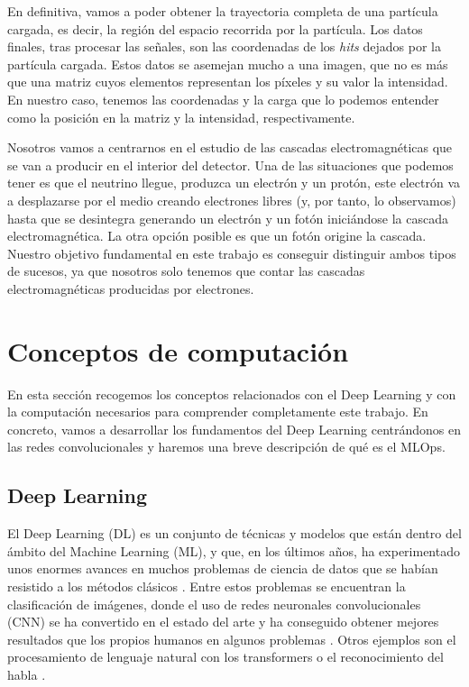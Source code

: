 \documentclass[a4paper,12pt,oneside,titlepage]{book}
\begin{document}
En definitiva, vamos a poder obtener la trayectoria completa de una partícula cargada, es decir, la región del espacio recorrida por la partícula. Los datos finales, tras procesar las señales, son las coordenadas de los \textit{hits} dejados por la partícula cargada. Estos datos se asemejan mucho a una imagen, que no es más que una matriz cuyos elementos representan los píxeles y su valor la intensidad. En nuestro caso, tenemos las coordenadas y la carga que lo podemos entender como la posición en la matriz y la intensidad, respectivamente.

Nosotros vamos a centrarnos en el estudio de las cascadas electromagnéticas que se van a producir en el interior del detector. Una de las situaciones que podemos tener es que el neutrino llegue, produzca un electrón y un protón, este electrón va a desplazarse por el medio creando electrones libres (y, por tanto, lo observamos) hasta que se desintegra generando un electrón y un fotón iniciándose la cascada electromagnética. La otra opción posible es que un fotón origine la cascada. Nuestro objetivo fundamental en este trabajo es conseguir distinguir ambos tipos de sucesos, ya que nosotros solo tenemos que contar las cascadas electromagnéticas producidas por electrones.

\section{Conceptos de computación}

En esta sección recogemos los conceptos relacionados con el Deep Learning y con la computación necesarios para comprender completamente este trabajo. En concreto, vamos a desarrollar los fundamentos del Deep Learning centrándonos en las redes convolucionales y haremos una breve descripción de qué es el MLOps.


\subsection{Deep Learning}
\label{sec:dl}

El Deep Learning (DL) es un conjunto de técnicas y modelos que están dentro del ámbito del Machine Learning (ML), y que, en los últimos años, ha experimentado unos enormes avances en muchos problemas de ciencia de datos que se habían resistido a los métodos clásicos \cite{dl_nature}. Entre estos problemas se encuentran la clasificación de imágenes, donde el uso de redes neuronales convolucionales (CNN) se ha convertido en el estado del arte y ha conseguido obtener mejores resultados que los propios humanos en algunos problemas \cite{efficientnet}. Otros ejemplos son el procesamiento de lenguaje natural con los transformers o el reconocimiento del habla \cite{korean_dl}.
\end{document}
